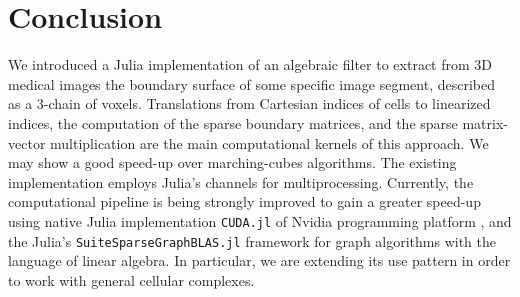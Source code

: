 
\section{Conclusion}\label{sec:conclusion}


We introduced a Julia implementation of an algebraic filter to extract from 3D medical images the
boundary surface of some specific image segment, described as a 3-chain of voxels. Translations from
Cartesian indices of cells to linearized indices, the computation of the sparse boundary matrices, and the
sparse matrix-vector multiplication are the main computational kernels of this approach. We may show
a good speed-up over marching-cubes algorithms. The existing implementation employs Julia's channels
for multiprocessing. Currently, the computational pipeline is being strongly improved to gain a greater
speed-up using native Julia implementation \texttt{CUDA.jl} of Nvidia programming platform 
, and the Julia's
\texttt{SuiteSparseGraphBLAS.jl} framework 
for graph algorithms with the language of linear algebra. In
particular, we are extending its use pattern in order to work with general cellular complexes.